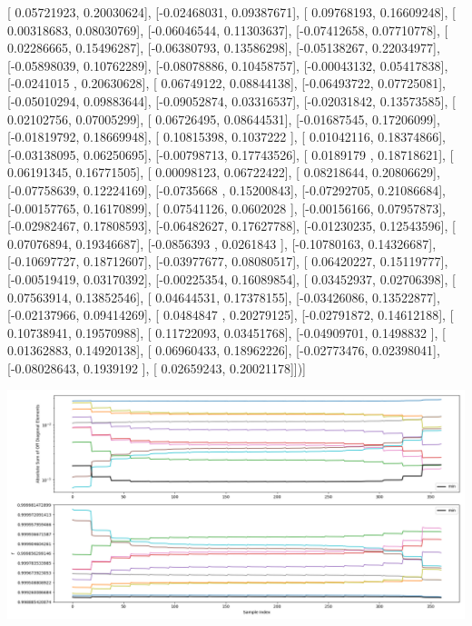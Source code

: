 \documentclass{article}
\begin{document}
       [ 0.05721923,  0.20030624],
       [-0.02468031,  0.09387671],
       [ 0.09768193,  0.16609248],
       [ 0.00318683,  0.08030769],
       [-0.06046544,  0.11303637],
       [-0.07412658,  0.07710778],
       [ 0.02286665,  0.15496287],
       [-0.06380793,  0.13586298],
       [-0.05138267,  0.22034977],
       [-0.05898039,  0.10762289],
       [-0.08078886,  0.10458757],
       [-0.00043132,  0.05417838],
       [-0.0241015 ,  0.20630628],
       [ 0.06749122,  0.08844138],
       [-0.06493722,  0.07725081],
       [-0.05010294,  0.09883644],
       [-0.09052874,  0.03316537],
       [-0.02031842,  0.13573585],
       [ 0.02102756,  0.07005299],
       [ 0.06726495,  0.08644531],
       [-0.01687545,  0.17206099],
       [-0.01819792,  0.18669948],
       [ 0.10815398,  0.1037222 ],
       [ 0.01042116,  0.18374866],
       [-0.03138095,  0.06250695],
       [-0.00798713,  0.17743526],
       [ 0.0189179 ,  0.18718621],
       [ 0.06191345,  0.16771505],
       [ 0.00098123,  0.06722422],
       [ 0.08218644,  0.20806629],
       [-0.07758639,  0.12224169],
       [-0.0735668 ,  0.15200843],
       [-0.07292705,  0.21086684],
       [-0.00157765,  0.16170899],
       [ 0.07541126,  0.0602028 ],
       [-0.00156166,  0.07957873],
       [-0.02982467,  0.17808593],
       [-0.06482627,  0.17627788],
       [-0.01230235,  0.12543596],
       [ 0.07076894,  0.19346687],
       [-0.0856393 ,  0.0261843 ],
       [-0.10780163,  0.14326687],
       [-0.10697727,  0.18712607],
       [-0.03977677,  0.08080517],
       [ 0.06420227,  0.15119777],
       [-0.00519419,  0.03170392],
       [-0.00225354,  0.16089854],
       [ 0.03452937,  0.02706398],
       [ 0.07563914,  0.13852546],
       [ 0.04644531,  0.17378155],
       [-0.03426086,  0.13522877],
       [-0.02137966,  0.09414269],
       [ 0.0484847 ,  0.20279125],
       [-0.02791872,  0.14612188],
       [ 0.10738941,  0.19570988],
       [ 0.11722093,  0.03451768],
       [-0.04909701,  0.1498832 ],
       [ 0.01362883,  0.14920138],
       [ 0.06960433,  0.18962226],
       [-0.02773476,  0.02398041],
       [-0.08028643,  0.1939192 ],
       [ 0.02659243,  0.20021178]])]
\begin{center}
\includegraphics[scale=.9]{report_pickled_controls126/control_dpn_all.png}

\end{center}
\end{document}
